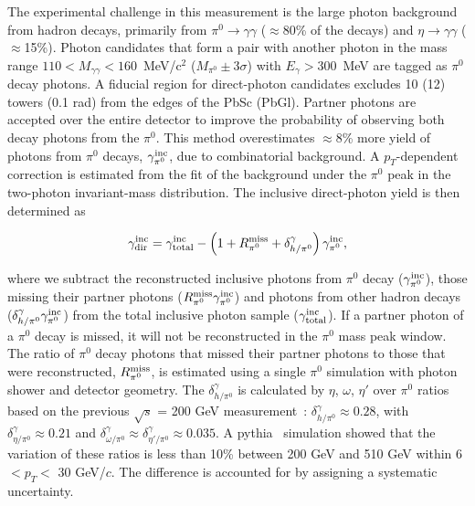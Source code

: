 \documentclass[twocolumn,letterpaper,aps,prl,longbibliography,superscriptaddress,floatfix]{revtex4-2}
\newcommand{\pT}{\mbox{$p_T$}\xspace}
\newcommand{\pizero}{\mbox{$\pi^0$}\xspace}
\begin{document}

The experimental challenge in this measurement is the large photon 
background from hadron decays, primarily from 
$\pi^0 \rightarrow \gamma\gamma$ ($\approx$80\% of the decays) 
and $\eta \rightarrow 
\gamma\gamma$ ($\approx$15\%). Photon candidates that form a pair with 
another photon in the mass range 
$110<M_{\gamma\gamma}<160$~MeV/c$^2$ ($M_{\pi^0}{\pm}3\sigma$) 
with $E_{\gamma}>300$~MeV are 
tagged as \pizero decay photons. A fiducial region for direct-photon 
candidates excludes 10 (12) towers (0.1 rad) from the edges of the PbSc 
(PbGl). Partner photons are accepted over the entire detector to 
improve the probability of observing both decay photons from the 
\pizero.  This method overestimates $\approx$8\% more yield of photons 
from \pizero decays, $\gamma_{\pi^0}^{{\rm inc}}$, due to combinatorial 
background. A \pT-dependent correction is estimated from the fit of the 
background under the \pizero peak in the two-photon invariant-mass 
distribution. The inclusive direct-photon yield is then determined as

\begin{equation} \label{eq:inc}
\gamma_{{\rm dir}}^{{\rm inc}} = \gamma_{{\rm total}}^{{\rm inc}} - \left( 1 + R_{\pi^0}^{{\rm miss}} + \delta_{h/\pi^0}^{\gamma} \right) \gamma_{\pi^0}^{{\rm inc}},
\end{equation}

\noindent where we subtract the reconstructed inclusive photons from \pizero decay 
($\gamma_{\pi^0}^{{\rm inc}}$), those missing their partner photons 
($R_{\pi^0}^{{\rm miss}}\gamma_{\pi^0}^{{\rm inc}}$) and photons from 
other hadron decays 
($\delta_{h/\pi^0}^{\gamma}\gamma_{\pi^0}^{{\rm inc}}$) from the total 
inclusive photon sample ($\gamma_{{\rm total}}^{{\rm inc}}$). If a 
partner photon of a \pizero decay is missed, it will not be 
reconstructed in the \pizero mass peak window. The ratio of \pizero 
decay photons that missed their partner photons to those that were 
reconstructed, $R_{\pi^0}^{{\rm miss}}$, is estimated using a single 
\pizero simulation with photon shower and detector geometry. 
The $\delta_{h/\pi^0}^{\gamma}$ is calculated by $\eta$, $\omega$, $\eta'$ 
over \pizero ratios based on the previous $\sqrt{s}$ = 200 GeV 
measurement~\cite{PhysRevD.83.052004}: 
$\delta_{h/\pi^0}^{\gamma}{\approx}0.28$, with 
$\delta_{\eta/\pi^0}^{\gamma}{\approx}0.21$ and 
$\delta_{\omega/\pi^0}^{\gamma}{\approx}\delta_{\eta'/\pi^0}^{\gamma}{\approx}0.035$. 
A {\sc pythia}~\cite{Sjostrand:2006za} simulation showed that 
the variation of these ratios is less than 10\% between 200 GeV and 510 
GeV within 6 $< p_T <$ 30 GeV/$c$. The difference is accounted for by 
assigning a systematic uncertainty.
\end{document}
